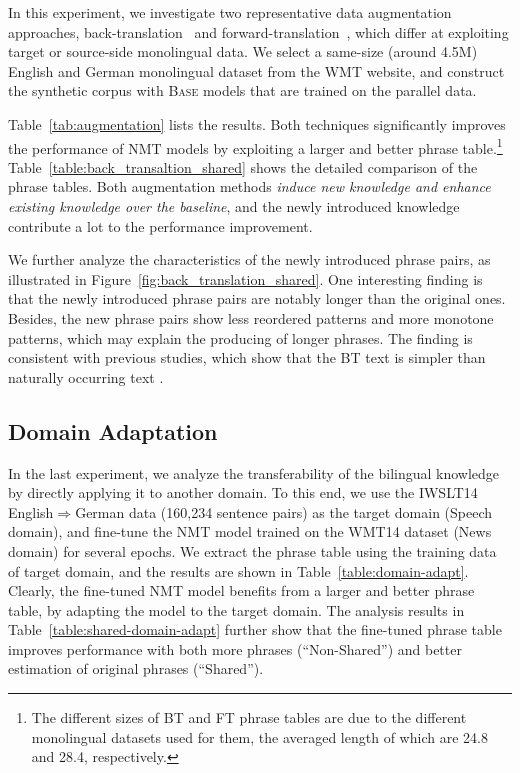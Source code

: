 \documentclass[11pt,a4paper]{article}
\begin{document}
In this experiment, we investigate two representative data augmentation approaches, back-translation~\cite{sennrich:2016:acl} and forward-translation~\cite{zhang2016exploiting}, which differ at exploiting target or source-side monolingual data. We select a same-size (around 4.5M) English and German monolingual dataset from the WMT website, and construct the synthetic corpus with \textsc{Base} models that are trained on the parallel data.

Table~\ref{tab:augmentation} lists the results. Both techniques significantly improves the performance of NMT models by exploiting a larger and better phrase table.\footnote{The different sizes of BT and FT phrase tables are due to the different monolingual datasets used for them, the averaged length of which are 24.8 and 28.4, respectively.}
Table~\ref{table:back_transaltion_shared} shows the detailed comparison of the phrase tables. Both augmentation methods {\em induce new knowledge and enhance existing knowledge over the baseline}, and the newly introduced knowledge contribute a lot to the performance improvement.

We further analyze the characteristics of the newly introduced phrase pairs, as illustrated in Figure~\ref{fig:back_translation_shared}. One interesting finding is that the newly introduced phrase pairs are notably longer than the original ones. Besides, the new phrase pairs show less reordered patterns and more monotone patterns, {which may explain the producing of longer phrases. The finding is consistent with previous studies, which show that the BT text is simpler than naturally occurring text \cite{edunov2019evaluation}.}



\subsection{Domain Adaptation}
\label{sec:adaptation}


In the last experiment, we analyze the transferability of the bilingual knowledge by directly applying it to another domain. To this end, we use the IWSLT14 English$\Rightarrow$German data (160,234 sentence pairs) as the target domain (Speech domain), and fine-tune the NMT model trained on the WMT14 dataset (News domain) for several epochs.
We extract the phrase table using the training data of target domain, and the results are shown in  Table~\ref{table:domain-adapt}. Clearly, the fine-tuned NMT model benefits from a larger and better phrase table, by adapting the model to the target domain. The analysis results in Table~\ref{table:shared-domain-adapt} further show that the fine-tuned phrase table improves performance with both more phrases (``Non-Shared'') and better estimation of original phrases (``Shared'').
\end{document}
